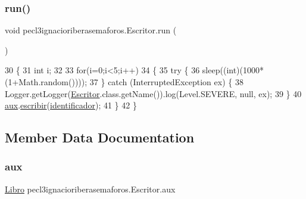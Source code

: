 \subsubsection{\texorpdfstring{run()}{run()}}
{\footnotesize\ttfamily void pecl3ignacioriberasemaforos.\+Escritor.\+run (\begin{DoxyParamCaption}{ }\end{DoxyParamCaption})\hspace{0.3cm}{\ttfamily [inline]}}


\begin{DoxyCode}
30     \{
31         \textcolor{keywordtype}{int} i;
32         
33         \textcolor{keywordflow}{for}(i=0;i<5;i++)
34         \{
35             \textcolor{keywordflow}{try} \{
36                 sleep((\textcolor{keywordtype}{int})(1000*(1+Math.random())));
37             \} \textcolor{keywordflow}{catch} (InterruptedException ex) \{
38                 Logger.getLogger(\mbox{\hyperlink{classpecl3ignacioriberasemaforos_1_1_escritor_ac8030392b7fea613a67850ab0627806f}{Escritor}}.class.getName()).log(Level.SEVERE, null, ex);
39             \}
40             \mbox{\hyperlink{classpecl3ignacioriberasemaforos_1_1_escritor_acb29c7b48dcc9bf7484acf45cdc97f48}{aux}}.\mbox{\hyperlink{classpecl3ignacioriberasemaforos_1_1_libro_a8077242f921bac18bb1205ae15356d95}{escribir}}(\mbox{\hyperlink{classpecl3ignacioriberasemaforos_1_1_escritor_a991425a23a35a53239d3c22a16eeba2d}{identificador}});
41         \}
42     \}
\end{DoxyCode}


\subsection{Member Data Documentation}
\mbox{\label{classpecl3ignacioriberasemaforos_1_1_escritor_acb29c7b48dcc9bf7484acf45cdc97f48}} 
\subsubsection{\texorpdfstring{aux}{aux}}
{\footnotesize\ttfamily \mbox{\hyperlink{classpecl3ignacioriberasemaforos_1_1_libro}{Libro}} pecl3ignacioriberasemaforos.\+Escritor.\+aux\hspace{0.3cm}{\ttfamily [package]}}

